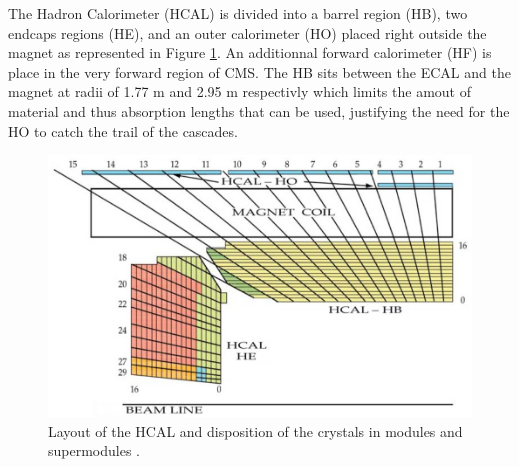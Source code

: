     The Hadron Calorimeter (HCAL) is divided into a barrel region (HB), two endcaps regions (HE), and an outer calorimeter (HO) placed right outside the magnet as represented in Figure \ref{fig:I-3-hcal}. An additionnal forward calorimeter (HF) is place in the very forward region of CMS. The HB sits between the ECAL and the magnet at radii of 1.77 m and 2.95 m respectivly which limits the amout of material and thus absorption lengths that can be used, justifying the need for the HO to catch the trail of the cascades. \\

    \begin{figure}[h!]
      \centering
      \includegraphics[width=\textwidth]{img/I-3-cms/hcal.png}
      \caption{Layout of the HCAL and disposition of the crystals in modules and supermodules \cite{1748-0221-3-08-S08004}.}
      \label{fig:I-3-hcal}
    \end{figure}

